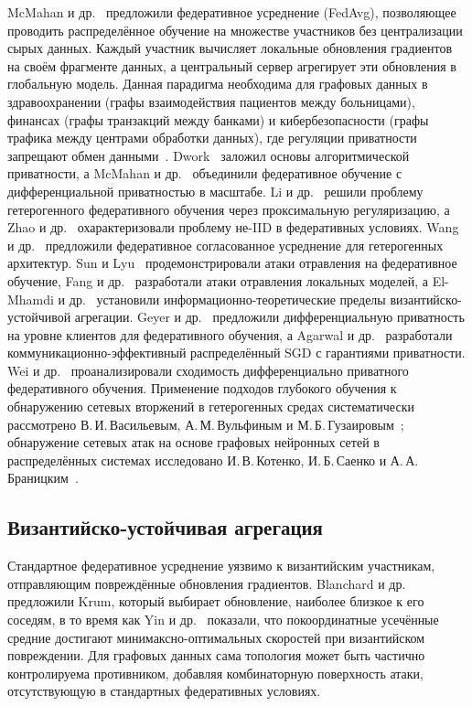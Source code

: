 McMahan и др.~\cite{McMahan2017} предложили федеративное усреднение (FedAvg), позволяющее проводить распределённое обучение на множестве участников без централизации сырых данных. Каждый участник вычисляет локальные обновления градиентов на своём фрагменте данных, а центральный сервер агрегирует эти обновления в глобальную модель. Данная парадигма необходима для графовых данных в здравоохранении (графы взаимодействия пациентов между больницами), финансах (графы транзакций между банками) и кибербезопасности (графы трафика между центрами обработки данных), где регуляции приватности запрещают обмен данными~\cite{Kairouz2021,Konecny2016,Mothukuri2021}. Dwork~\cite{Dwork2014} заложил основы алгоритмической приватности, а McMahan и др.~\cite{McMahan2018dp} объединили федеративное обучение с дифференциальной приватностью в масштабе. Li и др.~\cite{Li2020fedprox} решили проблему гетерогенного федеративного обучения через проксимальную регуляризацию, а Zhao и др.~\cite{Zhao2020fl_noniid} охарактеризовали проблему не-IID в федеративных условиях. Wang и др.~\cite{Wang2020fedma} предложили федеративное согласованное усреднение для гетерогенных архитектур. Sun и Lyu~\cite{Sun2019fl_poison} продемонстрировали атаки отравления на федеративное обучение, Fang и др.~\cite{Fang2020} разработали атаки отравления локальных моделей, а El-Mhamdi и др.~\cite{ElMhamdi2018} установили информационно-теоретические пределы византийско-устойчивой агрегации. Geyer и др.~\cite{Geyer2017} предложили дифференциальную приватность на уровне клиентов для федеративного обучения, а Agarwal и др.~\cite{Agarwal2018cpsgd,Bernstein2017,Bernstein2019} разработали коммуникационно-эффективный распределённый SGD с гарантиями приватности. Wei и др.~\cite{Wei2020dpfl} проанализировали сходимость дифференциально приватного федеративного обучения. Применение подходов глубокого обучения к обнаружению сетевых вторжений в гетерогенных средах систематически рассмотрено В.\,И.\,Васильевым, А.\,М.\,Вульфиным и М.\,Б.\,Гузаировым~\cite{Vasilyev2020idps}; обнаружение сетевых атак на основе графовых нейронных сетей в распределённых системах исследовано И.\,В.\,Котенко, И.\,Б.\,Саенко и А.\,А.\,Браницким~\cite{Kotenko2021gnn}.


\subsection{Византийско-устойчивая агрегация}

Стандартное федеративное усреднение уязвимо к византийским участникам, отправляющим повреждённые обновления градиентов. Blanchard и др.~\cite{Blanchard2017} предложили Krum, который выбирает обновление, наиболее близкое к его соседям, в то время как Yin и др.~\cite{Yin2018} показали, что покоординатные усечённые средние достигают минимаксно-оптимальных скоростей при византийском повреждении. Для графовых данных сама топология может быть частично контролируема противником, добавляя комбинаторную поверхность атаки, отсутствующую в стандартных федеративных условиях.


